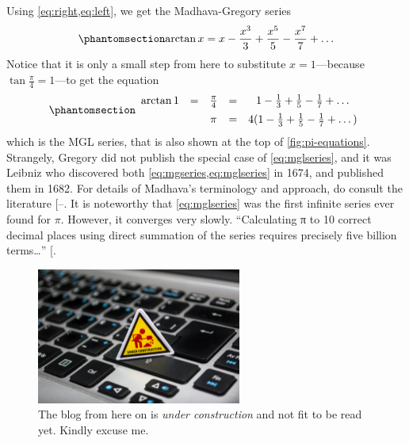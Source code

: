 \documentclass[
  a4paper,
]{article}
\begin{document}
Using \cref{eq:right,eq:left}, we get the Madhava-Gregory series
\begin{equation}\phantomsection\label{eq:mgseries}{
\arctan x = x - \frac{x^3}{3} + \frac{x^5}{5} - \frac{x^7}{7} + \dots
}\end{equation} Notice that it is only a small step from here to
substitute \(x = 1\)---because \(\tan\frac{\pi}{4} = 1\)---to get the
equation \begin{equation}\phantomsection\label{eq:mglseries}{
\begin{array}{ccccc}
\arctan 1 & = & \frac{\pi}{4} & = & 1 - \frac{1}{3} + \frac{1}{5} - \frac{1}{7} + \dots \\[0.5em]
&  & \pi & = & 4(1 - \frac{1}{3} + \frac{1}{5} - \frac{1}{7} + \dots)
\end{array}
}\end{equation} which is the MGL series, that is also shown at the top
of \cref{fig:pi-equations}. Strangely, Gregory did not publish the
special case of \cref{eq:mglseries}, and it was Leibniz who discovered
both \cref{eq:mgseries,eq:mglseries} in 1674, and published them in
1682. For details of Madhava's terminology and approach, do consult the
literature
{[}--\citeproc{ref-joseph2011}{19}{]}. It is
noteworthy that \cref{eq:mglseries} was the first infinite series ever
found for \(\pi\). However, it converges very slowly. ``Calculating π to
10 correct decimal places using direct summation of the series requires
precisely five billion terms\ldots{}''
{[}\citeproc{ref-leibniz-pi}{21}{]}.

\begin{figure}
\centering
\includegraphics[width=0.6\textwidth,height=\textheight]{images/under-construction.jpg}
\caption[The blog from here on is \emph{under construction} and not fit
to be read yet. Kindly excuse me.]{The blog from here on is \emph{under
construction} and not fit to be read yet. Kindly excuse
me.\footnotemark{}}\label{fig:under-construction}
\end{figure}
\end{document}
